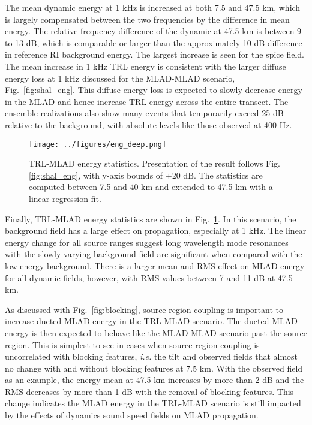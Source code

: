\documentclass[preprint,NumberedRefs]{JASA}
\begin{document}
The mean dynamic energy at 1 kHz is increased at both 7.5 and 47.5 km, which is largely compensated between the two frequencies by the difference in mean energy. The relative frequency difference of the dynamic at 47.5 km is between 9 to 13 dB, which is comparable or larger than the approximately 10 dB difference in reference RI background energy. The largest increase is seen for the spice field. The mean increase in 1 kHz TRL energy is consistent with the larger diffuse energy loss at 1 kHz discussed for the MLAD-MLAD scenario, Fig.~\ref{fig:shal_eng}. This diffuse energy loss is expected to slowly decrease energy in the MLAD and hence increase TRL energy across the entire transect. The ensemble realizations also show many events that temporarily exceed 25 dB relative to the background, with absolute levels like those observed at 400 Hz.

\begin{figure}
\texttt{[image: ../figures/eng\_deep.png]}
    \caption{TRL-MLAD energy statistics. Presentation of the result follows Fig. \ref{fig:shal_eng}, with y-axis bounds of $\pm$20 dB. The statistics are computed between 7.5 and 40 km and extended to 47.5 km with a linear regression fit.}
    \label{fig:deep_eng}
\end{figure}
Finally, TRL-MLAD energy statistics are shown in Fig.~\ref{fig:deep_eng}. In this scenario, the background field has a large effect on propagation, especially at 1 kHz. The linear energy change for all source ranges suggest long wavelength mode resonances with the slowly varying background field\cite{colosi21} are significant when compared with the low energy background. There is a larger mean and RMS effect on MLAD energy for all dynamic fields, however, with RMS values between 7 and 11 dB at 47.5 km.

As discussed with Fig.~\ref{fig:blocking}, source region coupling is important to increase ducted MLAD energy in the TRL-MLAD scenario. The ducted MLAD energy is then expected to behave like the MLAD-MLAD scenario past the source region. This is simplest to see in cases when source region coupling is uncorrelated with blocking features, \emph{i.e.} the tilt and observed fields that almost no change with and without blocking features at 7.5 km. With the observed field as an example, the energy mean at 47.5 km increases by more than 2 dB and the RMS decreases by more than 1 dB with the removal of blocking features. This change indicates the MLAD energy in the TRL-MLAD scenario is still impacted by the effects of dynamics sound speed fields on MLAD propagation.
\end{document}
